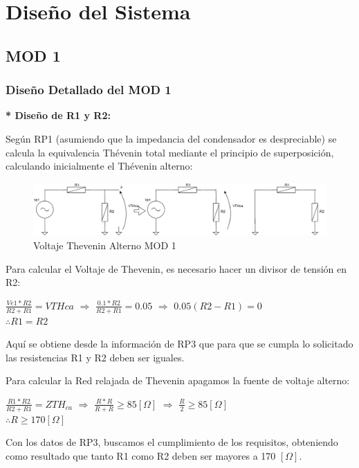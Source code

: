 \newpage
\section{Diseño del Sistema}

\subsection{MOD 1}
\label{sec5.1.}
\subsubsection{Diseño Detallado del MOD 1}
\textbf{* Diseño de R1 y R2:}\par
Según RP1 (asumiendo que la impedancia del condensador es despreciable) se calcula la equivalencia Thévenin total mediante el principio de superposición, calculando inicialmente el Thévenin alterno:\par 
\begin{figure}[h!]
    \Centering
    \includegraphics[scale=0.45]{Imagenes/6DisenoSistema/VTHcaMOD1.png}
    \caption{Voltaje Thevenin Alterno MOD 1}
	\label{fig:figure6}
\end{figure}
Para calcular el Voltaje de Thevenin, es necesario hacer un divisor de tensión en R2:\par 
\begin{center}
$\frac{Ve1 * R2}{R2 + R1} = VTHca$ \hspace{0.5cm} $\Rightarrow$\hspace{0.5cm} $\frac{0.1 * R2}{R2 + R1} = 0.05$ \hspace{0.5cm}$\Rightarrow$ \hspace{0.5cm}$0.05(R2 - R1) = 0$\\[0.5cm]
$\therefore R1  = R2$
\end{center}
Aquí se obtiene desde la información de RP3 que para que se cumpla lo solicitado las resistencias R1 y R2 deben ser iguales.\par

Para calcular la Red relajada de Thevenin apagamos la fuente de voltaje alterno:\par 
\begin{center}
 $\frac{R1 * R2}{R2 + R1} = ZTH_{ca}$\hspace{0.5cm} $\Rightarrow$\hspace{0.5cm} $\frac{R * R}{R + R}\geq 85 [\Omega]$\hspace{0.5cm} $\Rightarrow$ \hspace{0.5cm}$\frac{R}{2} \geq 85[\Omega]$\\[0.5cm]
$\therefore R\geq 170[\Omega]$   
\end{center}
Con los datos de RP3, buscamos el cumplimiento de los requisitos, obteniendo como resultado que tanto R1 como R2 deben ser mayores a 170 $[\Omega]$.\\[0.2cm] 

